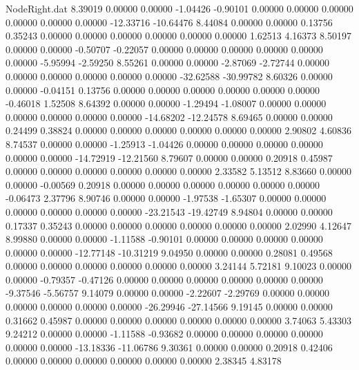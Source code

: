\begin{filecontents}{NodeRight.dat}
   8.39019    0.00000    0.00000    -1.04426   -0.90101    0.00000    0.00000    0.00000    0.00000    0.00000    0.00000  -12.33716  -10.64476
   8.44084    0.00000    0.00000     0.13756    0.35243    0.00000    0.00000    0.00000    0.00000    0.00000    0.00000    1.62513    4.16373
   8.50197    0.00000    0.00000    -0.50707   -0.22057    0.00000    0.00000    0.00000    0.00000    0.00000    0.00000   -5.95994   -2.59250
   8.55261    0.00000    0.00000    -2.87069   -2.72744    0.00000    0.00000    0.00000    0.00000    0.00000    0.00000  -32.62588  -30.99782
   8.60326    0.00000    0.00000    -0.04151    0.13756    0.00000    0.00000    0.00000    0.00000    0.00000    0.00000   -0.46018    1.52508
   8.64392    0.00000    0.00000    -1.29494   -1.08007    0.00000    0.00000    0.00000    0.00000    0.00000    0.00000  -14.68202  -12.24578
   8.69465    0.00000    0.00000     0.24499    0.38824    0.00000    0.00000    0.00000    0.00000    0.00000    0.00000    2.90802    4.60836
   8.74537    0.00000    0.00000    -1.25913   -1.04426    0.00000    0.00000    0.00000    0.00000    0.00000    0.00000  -14.72919  -12.21560
   8.79607    0.00000    0.00000     0.20918    0.45987    0.00000    0.00000    0.00000    0.00000    0.00000    0.00000    2.33582    5.13512
   8.83660    0.00000    0.00000    -0.00569    0.20918    0.00000    0.00000    0.00000    0.00000    0.00000    0.00000   -0.06473    2.37796
   8.90746    0.00000    0.00000    -1.97538   -1.65307    0.00000    0.00000    0.00000    0.00000    0.00000    0.00000  -23.21543  -19.42749
   8.94804    0.00000    0.00000     0.17337    0.35243    0.00000    0.00000    0.00000    0.00000    0.00000    0.00000    2.02990    4.12647
   8.99880    0.00000    0.00000    -1.11588   -0.90101    0.00000    0.00000    0.00000    0.00000    0.00000    0.00000  -12.77148  -10.31219
   9.04950    0.00000    0.00000     0.28081    0.49568    0.00000    0.00000    0.00000    0.00000    0.00000    0.00000    3.24144    5.72181
   9.10023    0.00000    0.00000    -0.79357   -0.47126    0.00000    0.00000    0.00000    0.00000    0.00000    0.00000   -9.37546   -5.56757
   9.14079    0.00000    0.00000    -2.22607   -2.29769    0.00000    0.00000    0.00000    0.00000    0.00000    0.00000  -26.29946  -27.14566
   9.19145    0.00000    0.00000     0.31662    0.45987    0.00000    0.00000    0.00000    0.00000    0.00000    0.00000    3.74063    5.43303
   9.24212    0.00000    0.00000    -1.11588   -0.93682    0.00000    0.00000    0.00000    0.00000    0.00000    0.00000  -13.18336  -11.06786
   9.30361    0.00000    0.00000     0.20918    0.42406    0.00000    0.00000    0.00000    0.00000    0.00000    0.00000    2.38345    4.83178

\end{filecontents}
